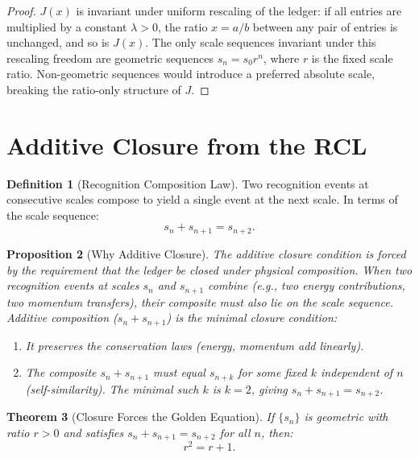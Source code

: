 \documentclass[12pt,a4paper]{article}
\newtheorem{theorem}{Theorem}[section]
\newtheorem{proposition}[theorem]{Proposition}
\theoremstyle{definition}
\newtheorem{definition}[theorem]{Definition}
\theoremstyle{remark}
\begin{document}
\begin{proof}
$J(x)$ is invariant under uniform rescaling of the ledger: if
all entries are multiplied by a constant $\lambda > 0$, the
ratio $x = a/b$ between any pair of entries is unchanged, and
so is $J(x)$.  The only scale sequences invariant under this
rescaling freedom are geometric sequences $s_n = s_0 r^n$,
where $r$ is the fixed scale ratio.  Non-geometric sequences
would introduce a preferred absolute scale, breaking the
ratio-only structure of $J$.
\end{proof}

\section{Additive Closure from the RCL}
\label{sec:closure}

\begin{definition}[Recognition Composition Law]
\label{def:rcl}
Two recognition events at consecutive scales compose to yield
a single event at the next scale.  In terms of the scale
sequence:
\begin{equation}
  s_n + s_{n+1} = s_{n+2}.
\end{equation}
\end{definition}

\begin{proposition}[Why Additive Closure]
\label{prop:why-additive}
The additive closure condition is forced by the requirement that
the ledger be closed under physical composition.  When two
recognition events at scales $s_n$ and $s_{n+1}$ combine
(e.g., two energy contributions, two momentum transfers), their
composite must also lie on the scale sequence.  Additive
composition ($s_n + s_{n+1}$) is the minimal closure condition:
\begin{enumerate}[label=(\roman*),nosep]
  \item It preserves the conservation laws (energy, momentum
  add linearly).
  \item The composite $s_n + s_{n+1}$ must equal $s_{n+k}$ for
  some fixed $k$ independent of $n$ (self-similarity).  The
  minimal such $k$ is $k = 2$, giving $s_n + s_{n+1} = s_{n+2}$.
\end{enumerate}
\end{proposition}

\begin{theorem}[Closure Forces the Golden Equation]
\label{thm:golden-eq}
If $\{s_n\}$ is geometric with ratio $r > 0$ and satisfies
$s_n + s_{n+1} = s_{n+2}$ for all $n$, then:
\begin{equation}
  \boxed{r^2 = r + 1.}
\end{equation}
\end{theorem}
\end{document}
